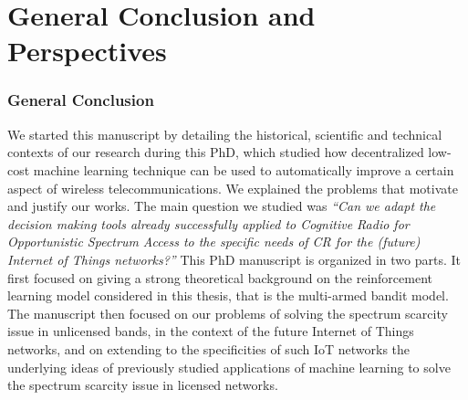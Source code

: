
\chapter{General Conclusion and Perspectives}
\label{chapter:conclusion}

\graphicspath{{2-Chapters/6-Chapter/Images/}}



\subsection*{General Conclusion}


We started this manuscript by detailing the historical, scientific and technical contexts of our research during this PhD, which studied how decentralized low-cost machine learning technique can be used to automatically improve a certain aspect of wireless telecommunications.
%
We explained the problems that motivate and justify our works.
%
The main question we studied was \emph{``Can we adapt the decision making tools already successfully applied to Cognitive Radio for Opportunistic Spectrum Access to the specific needs of CR for the (future) Internet of Things networks?''}
%
This PhD manuscript is organized in two parts.
It first focused on giving a strong theoretical background on the reinforcement learning model considered in this thesis, that is the multi-armed bandit model.
The manuscript then focused on our problems of solving the spectrum scarcity issue in unlicensed bands, in the context of the future Internet of Things networks,
and on extending to the specificities of such IoT networks the underlying ideas of previously studied applications of machine learning to solve the spectrum scarcity issue in licensed networks.


